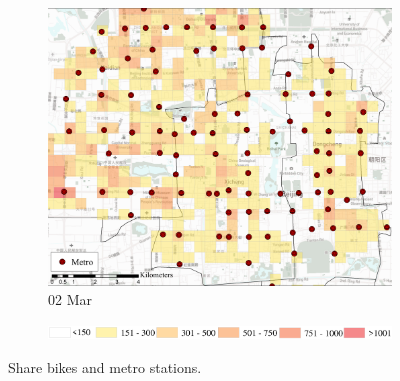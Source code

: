 \documentclass[preprints,article,accept,moreauthors,pdftex]{Definitions/mdpi}
\begin{document}
\begin{figure}[H]
\begin{subfigure}{.32\textwidth}
        \includegraphics[width=\textwidth]{Figures/Relation_with_POIs/POIsMetroD2020_03_02.pdf}
        \caption{02 Mar}
    \end{subfigure}

    \vspace{6pt}
    \begin{subfigure}{.7\textwidth}
        \includegraphics[width=\textwidth]{Figures/AppendixLegend2.eps}
    \end{subfigure}
    \caption{Share bikes and metro stations.}
    \label{fig:BSS_metro}
\end{figure}

\end{document}
